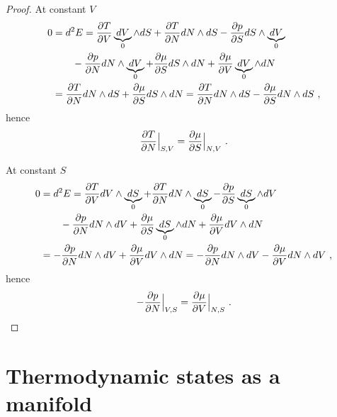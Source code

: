 \begin{proof}
        At constant $V$ 
        \begin{equation*}
        \begin{aligned}
            0 & = d^2 E = \frac{\partial T}{\partial V} \underbrace{dV}_0 \wedge dS + \frac{\partial T}{\partial N} dN \wedge dS - \frac{\partial p}{\partial S} dS \wedge \underbrace{dV}_0 \\ & \qquad - \frac{\partial p}{\partial N} dN \wedge \underbrace{dV}_0 + \frac{\partial\mu}{\partial S} dS \wedge dN + \frac{\partial\mu}{\partial V} \underbrace{dV}_0 \wedge dN \\ & = \frac{\partial T}{\partial N} dN \wedge dS + \frac{\partial\mu}{\partial S} dS \wedge dN = \frac{\partial T}{\partial N} dN \wedge dS - \frac{\partial\mu}{\partial S} dN \wedge dS~,
        \end{aligned}
        \end{equation*}
        hence 
        \begin{equation*}
            \frac{\partial T}{\partial N} \Big \vert_{S,V} = \frac{\partial\mu}{\partial S} \Big \vert_{N, V} ~.
        \end{equation*}

        At constant $S$ 
        \begin{equation*}
        \begin{aligned}
            0 & = d^2 E = \frac{\partial T}{\partial V} dV \wedge \underbrace{dS}_0 + \frac{\partial T}{\partial N} dN \wedge \underbrace{dS}_0 - \frac{\partial p}{\partial S} \underbrace{dS}_0 \wedge dV \\ & \qquad - \frac{\partial p}{\partial N} dN \wedge dV + \frac{\partial\mu}{\partial S} \underbrace{dS}_0 \wedge dN + \frac{\partial\mu}{\partial V} dV \wedge dN \\ & = - \frac{\partial p}{\partial N} dN \wedge dV + \frac{\partial\mu}{\partial V} dV \wedge dN = - \frac{\partial p}{\partial N} dN \wedge dV - \frac{\partial\mu}{\partial V} dN \wedge dV ~,
        \end{aligned}
        \end{equation*}
        hence 
        \begin{equation*}
            - \frac{\partial p}{\partial N} \Big \vert_{V,S} = \frac{\partial\mu}{\partial V} \Big \vert_{N, S} ~.
        \end{equation*}
    \end{proof}

\section{Thermodynamic states as a manifold}

